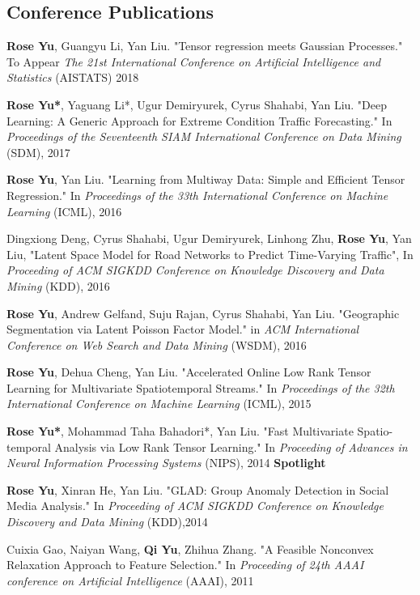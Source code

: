 \documentclass[margin,line]{res}
\begin{document}
\begin{resume}
\section{\sc Conference Publications}

{\bf Rose Yu}, Guangyu Li, Yan Liu. "Tensor regression meets Gaussian Processes." To Appear \textit{The 21st International Conference on Artificial Intelligence and Statistics } (AISTATS) 2018 

{\bf Rose Yu*}, Yaguang Li*, Ugur Demiryurek, Cyrus Shahabi, Yan Liu. "Deep Learning: A Generic Approach for Extreme Condition Traffic Forecasting." In \textit{Proceedings  of the Seventeenth SIAM International Conference on Data Mining }(SDM), 2017

{\bf Rose Yu}, Yan Liu. "Learning from Multiway Data: Simple and Efficient Tensor Regression." In \textit{Proceedings  of the 33th International Conference on Machine Learning }(ICML),   2016

Dingxiong Deng, Cyrus Shahabi, Ugur Demiryurek, Linhong Zhu, {\bf Rose Yu}, Yan Liu, 
"Latent Space Model for Road Networks to Predict Time-Varying Traffic", In \textit{Proceeding of ACM SIGKDD Conference on Knowledge Discovery and Data Mining } (KDD), 2016


{\bf Rose Yu}, Andrew Gelfand, Suju Rajan, Cyrus Shahabi, Yan Liu. "Geographic Segmentation via Latent Poisson Factor Model." in \textit{ACM International Conference on Web Search and Data Mining} (WSDM), 2016 

{\bf Rose Yu}, Dehua Cheng, Yan Liu. "Accelerated Online Low Rank Tensor Learning for Multivariate Spatiotemporal Streams." In \textit{Proceedings  of the 32th International Conference on Machine Learning} (ICML), 2015

{\bf Rose Yu*}, Mohammad Taha Bahadori*, Yan Liu. "Fast Multivariate Spatio-temporal Analysis via Low Rank Tensor Learning." In \textit{Proceeding of Advances in Neural Information Processing Systems} (NIPS), 2014 \textbf{Spotlight}

{\bf Rose Yu}, Xinran He, Yan Liu. "GLAD: Group Anomaly Detection in Social Media Analysis." In \textit{Proceeding of ACM SIGKDD Conference on Knowledge Discovery and Data Mining} (KDD),2014

Cuixia Gao, Naiyan Wang, {\bf Qi Yu}, Zhihua Zhang. "A Feasible Nonconvex Relaxation Approach to Feature Selection." In \textit{Proceeding of 24th AAAI conference on Artificial Intelligence} (AAAI), 2011 


\end{resume}
\end{document}
